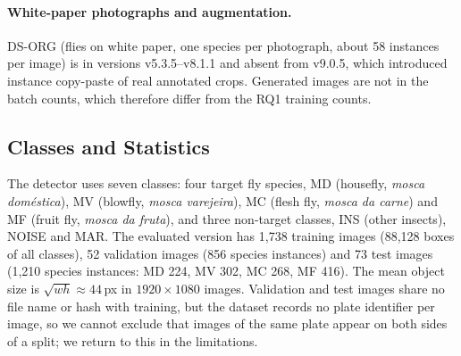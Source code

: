 \paragraph{White-paper photographs and augmentation.}
DS-ORG (flies on white paper, one species per photograph, about 58 instances per image) is in versions v5.3.5--v8.1.1 and absent from v9.0.5, which introduced instance copy-paste of real annotated crops. Generated images are not in the batch counts, which therefore differ from the RQ1 training counts.

\subsection{Classes and Statistics}
\label{sec:dataset:classes}

The detector uses seven classes: four target fly species, MD (housefly, \emph{mosca doméstica}), MV (blowfly, \emph{mosca varejeira}), MC (flesh fly, \emph{mosca da carne}) and MF (fruit fly, \emph{mosca da fruta}), and three non-target classes, INS (other insects), NOISE and MAR. The evaluated version has 1{,}738 training images (88{,}128 boxes of all classes), 52 validation images (856 species instances) and 73 test images (1{,}210 species instances: MD 224, MV 302, MC 268, MF 416). The mean object size is $\sqrt{wh}\approx44$\,px in $1920\times1080$ images. Validation and test images share no file name or hash with training, but the dataset records no plate identifier per image, so we cannot exclude that images of the same plate appear on both sides of a split; we return to this in the limitations.
